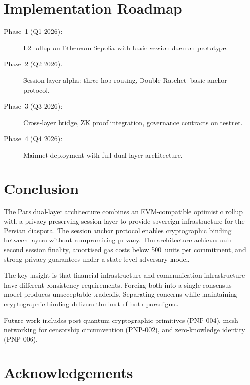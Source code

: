 \documentclass[11pt,a4paper]{article}
\begin{document}
\section{Implementation Roadmap}
\label{sec:roadmap}

\begin{description}
    \item[Phase~1 (Q1 2026):] L2 rollup on Ethereum Sepolia with basic
    session daemon prototype.
    \item[Phase~2 (Q2 2026):] Session layer alpha: three-hop routing,
    Double Ratchet, basic anchor protocol.
    \item[Phase~3 (Q3 2026):] Cross-layer bridge, ZK proof integration,
    governance contracts on testnet.
    \item[Phase~4 (Q4 2026):] Mainnet deployment with full dual-layer
    architecture.
\end{description}

\section{Conclusion}
\label{sec:conclusion}

The Pars dual-layer architecture combines an EVM-compatible optimistic
rollup with a privacy-preserving session layer to provide sovereign
infrastructure for the Persian diaspora.  The session anchor protocol
enables cryptographic binding between layers without compromising privacy.
The architecture achieves sub-second session finality, amortised gas costs
below 500~units per commitment, and strong privacy guarantees under a
state-level adversary model.

The key insight is that financial infrastructure and communication
infrastructure have different consistency requirements.  Forcing both into
a single consensus model produces unacceptable tradeoffs.  Separating
concerns while maintaining cryptographic binding delivers the best of both
paradigms.

Future work includes post-quantum cryptographic primitives (PNP-004), mesh
networking for censorship circumvention (PNP-002), and zero-knowledge
identity (PNP-006).

\section*{Acknowledgements}
\end{document}
